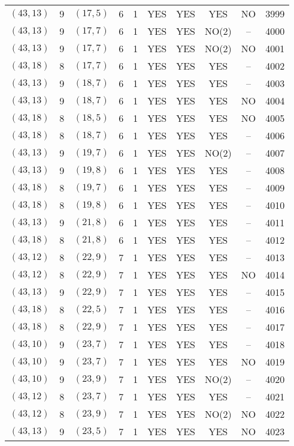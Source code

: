 \begin{longtable}{|c|c|c|c|c|c|c|c|c|c|}
$(43, 13)$ & 9 & $(17, 5)$ & 6 & 1 & YES & YES & YES & NO & 3999\\
$(43, 13)$ & 9 & $(17, 7)$ & 6 & 1 & YES & YES & NO(2) & -- & 4000\\
$(43, 13)$ & 9 & $(17, 7)$ & 6 & 1 & YES & YES & NO(2) & NO & 4001\\
$(43, 18)$ & 8 & $(17, 7)$ & 6 & 1 & YES & YES & YES & -- & 4002\\
$(43, 13)$ & 9 & $(18, 7)$ & 6 & 1 & YES & YES & YES & -- & 4003\\
$(43, 13)$ & 9 & $(18, 7)$ & 6 & 1 & YES & YES & YES & NO & 4004\\
$(43, 18)$ & 8 & $(18, 5)$ & 6 & 1 & YES & YES & YES & NO & 4005\\
$(43, 18)$ & 8 & $(18, 7)$ & 6 & 1 & YES & YES & YES & -- & 4006\\
$(43, 13)$ & 9 & $(19, 7)$ & 6 & 1 & YES & YES & NO(2) & -- & 4007\\
$(43, 13)$ & 9 & $(19, 8)$ & 6 & 1 & YES & YES & YES & -- & 4008\\
$(43, 18)$ & 8 & $(19, 7)$ & 6 & 1 & YES & YES & YES & -- & 4009\\
$(43, 18)$ & 8 & $(19, 8)$ & 6 & 1 & YES & YES & YES & -- & 4010\\
$(43, 13)$ & 9 & $(21, 8)$ & 6 & 1 & YES & YES & YES & -- & 4011\\
$(43, 18)$ & 8 & $(21, 8)$ & 6 & 1 & YES & YES & YES & -- & 4012\\
$(43, 12)$ & 8 & $(22, 9)$ & 7 & 1 & YES & YES & YES & -- & 4013\\
$(43, 12)$ & 8 & $(22, 9)$ & 7 & 1 & YES & YES & YES & NO & 4014\\
$(43, 13)$ & 9 & $(22, 9)$ & 7 & 1 & YES & YES & YES & -- & 4015\\
$(43, 18)$ & 8 & $(22, 5)$ & 7 & 1 & YES & YES & YES & -- & 4016\\
$(43, 18)$ & 8 & $(22, 9)$ & 7 & 1 & YES & YES & YES & -- & 4017\\
$(43, 10)$ & 9 & $(23, 7)$ & 7 & 1 & YES & YES & YES & -- & 4018\\
$(43, 10)$ & 9 & $(23, 7)$ & 7 & 1 & YES & YES & YES & NO & 4019\\
$(43, 10)$ & 9 & $(23, 9)$ & 7 & 1 & YES & YES & NO(2) & -- & 4020\\
$(43, 12)$ & 8 & $(23, 7)$ & 7 & 1 & YES & YES & YES & -- & 4021\\
$(43, 12)$ & 8 & $(23, 9)$ & 7 & 1 & YES & YES & NO(2) & NO & 4022\\
$(43, 13)$ & 9 & $(23, 5)$ & 7 & 1 & YES & YES & YES & NO & 4023\\

\end{longtable}
